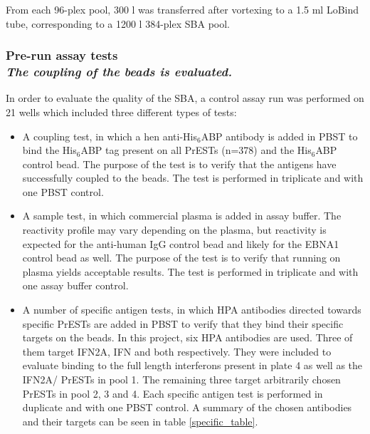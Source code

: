 \documentclass{article}
\begin{document}
From each 96-plex pool, 300 \textmu l was transferred after vortexing to a 1.5 ml LoBind tube, corresponding to a 1200 \textmu l 384-plex SBA pool.

\subsubsection[Pre-run assay tests]{Pre-run assay tests\\{\normalfont\slshape\normalsize The coupling of the beads is evaluated.}}

In order to evaluate the quality of the SBA, a control assay run was performed on 21 wells which included three different types of tests:
\begin{itemize}
    \item A coupling test, in which a hen anti-His$_6$ABP antibody is added in PBST to bind the His$_6$ABP tag present on all PrESTs (n=378) and the His$_6$ABP control bead. The purpose of the test is to verify that the antigens have successfully coupled to the beads. The test is performed in triplicate and with one PBST control.
    \item A sample test, in which commercial plasma is added in assay buffer. The reactivity profile may vary depending on the plasma, but reactivity is expected for the anti-human IgG control bead and likely for the EBNA1 control bead as well. The purpose of the test is to verify that running on plasma yields acceptable results. The test is performed in triplicate and with one assay buffer control.
    \item A number of specific antigen tests, in which HPA antibodies directed towards specific PrESTs are added in PBST to verify that they bind their specific targets on the beads. In this project, six HPA antibodies are used. Three of them target IFN\textalpha2A, IFN{\textomega} and both respectively. They were included to evaluate binding to the full length interferons present in plate 4 as well as the IFN{\textalpha2A/\textomega} PrESTs in pool 1. The remaining three target arbitrarily chosen PrESTs in pool 2, 3 and 4. Each specific antigen test is performed in duplicate and with one PBST control. A summary of the chosen antibodies and their targets can be seen in table \ref{specific_table}.
\end{itemize}
\end{document}
